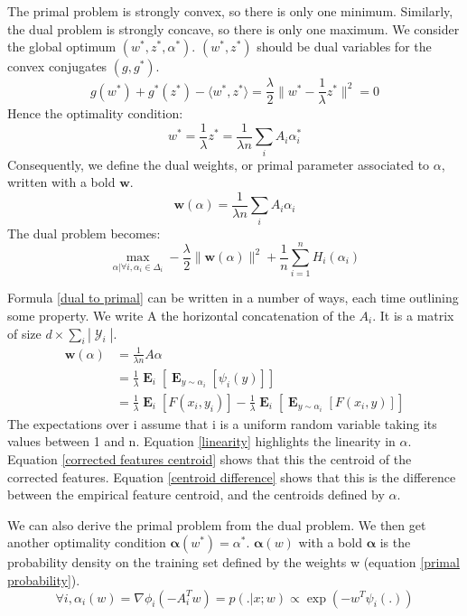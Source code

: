 \documentclass{article}
\DeclareMathOperator{\1}{\mathbb{1}}
\DeclareMathOperator{\E}{\mathbf{E}}
\DeclareMathOperator{\Y}{\mathcal{Y}}
\begin{document}
The primal problem is strongly convex, so there is only one minimum.
Similarly, the dual problem is strongly concave, so there is only one maximum.
We consider the global optimum $(w^*,z^*,\alpha^*)$.
$(w^*,z^*)$ should be dual variables for the convex conjugates $(g, g^*)$.
\begin{equation*}
	g(w^*) + g^*(z^*) - \langle w^*, z^* \rangle = \frac{\lambda}{2} \| w^* - \frac{1}{\lambda} z^* \|^2 = 0
\end{equation*}
Hence the optimality condition:
\begin{equation*}
	w^* = 	\frac{1}{\lambda} z^* =  \frac{1}{\lambda n} \sum_i A_i \alpha_i^*
\end{equation*}
Consequently, we define the dual weights, or primal parameter associated to $\alpha$, written with a bold $\bm w$.
\begin{equation}
	\label{dual to primal}
	\bm w(\alpha) =   \frac{1}{\lambda n} \sum_i A_i \alpha_i
\end{equation}
The dual problem becomes:
\begin{equation}
	\label{dual problem}
	\max_{\alpha | \forall i, \alpha_i \in \Delta_i} -\frac{\lambda}{2} \| \bm w(\alpha) \|^2 + \frac{1}{n} \sum_{i=1}^n H_i(\alpha_i)
\end{equation}

Formula \ref{dual to primal} can be written in a number of ways, each time outlining some property.
We write A the horizontal concatenation of the $A_i$.
It is a matrix of size $d \times \sum_i |\Y_i|$.
\begin{align}
	\bm w(\alpha) & = \frac{1}{\lambda n} A \alpha \label{linearity} \\
	 & = \frac{1}{\lambda} \E_{i} [ \E_{y \sim \alpha_i} [\psi_i(y)]] \label{corrected features centroid} \\
	 & =   \frac{1}{\lambda} \E_{i} [F(x_i, y_i)] - \frac{1}{\lambda} \E_{i} [ \E_{y \sim \alpha_i} [F(x_i, y)]]
	 \label{centroid difference}
\end{align}
The expectations over i assume that i is a uniform random variable taking its values between 1 and n. 
Equation \ref{linearity} highlights the linearity in $\alpha$. Equation \ref{corrected features centroid} shows that this the centroid of the corrected features. Equation \ref{centroid difference} shows that this is the difference between the empirical feature centroid, and the centroids defined by $\alpha$.

We can also derive the primal problem from the dual problem.
We then get another optimality condition $\bm \alpha(w^*) = \alpha^*$.
$\bm \alpha(w)$ with a bold $\bm \alpha$ is the probability density on the training set defined by the weights w (equation \ref{primal probability}).
\begin{equation}
	\label{primal to dual}
	\forall i, \alpha_i(w) = \nabla\phi_i(-A_i^Tw) = p(.|x; w) \propto \exp(-w^T \psi_i(.))
\end{equation}
\end{document}
